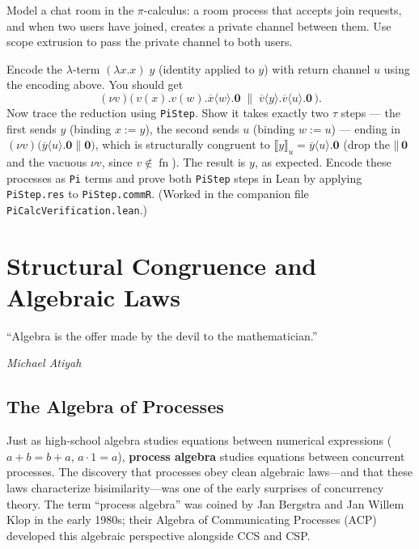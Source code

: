 \documentclass[11pt, a4paper, oneside]{book}
\newcommand{\nil}{\mathbf{0}}
\newcommand{\Par}{\mathbin{\|}}
\newcommand{\res}[1]{(\nu #1)}
\newcommand{\inp}[2]{#1(#2)}
\newcommand{\outp}[2]{\overline{#1}\langle #2 \rangle}
\newcommand{\fn}{\operatorname{fn}}
\newcommand{\lc}[1]{\texttt{#1}}
\newcounter{exercise}[chapter]
\begin{document}
\begin{exercisebox}[title={Exercise 6.1}]
Model a chat room in the $\pi$-calculus: a room process that accepts join
requests, and when two users have joined, creates a private channel between
them. Use scope extrusion to pass the private channel to both users.
\end{exercisebox}

\begin{exercisebox}[title={Exercise 6.2}]
Encode the $\lambda$-term $(\lambda x. x)\; y$ (identity applied to $y$) with
return channel $u$ using the encoding above. You should get
\[
  \res{v}\bigl(\,\inp{v}{x}.\inp{v}{w}.\outp{x}{w}.\nil
    \;\Par\;
    \outp{v}{y}.\outp{v}{u}.\nil\,\bigr).
\]
Now trace the reduction using \lc{PiStep}. Show it takes exactly two
$\tau$ steps --- the first sends $y$ (binding $x := y$), the second sends $u$
(binding $w := u$) --- ending in
$\res{v}\bigl(\outp{y}{u}.\nil \Par \nil\bigr)$, which is structurally
congruent to $⟦y⟧_u = \outp{y}{u}.\nil$ (drop the $\Par\,\nil$ and the vacuous
$\nu v$, since $v \notin \fn$). The result is $y$, as expected.
Encode these processes as \lc{Pi} terms and prove both \lc{PiStep} steps in
Lean by applying \lc{PiStep.res} to \lc{PiStep.commR}. (Worked in the
companion file \lc{PiCalcVerification.lean}.)
\end{exercisebox}

\chapter{Structural Congruence and Algebraic Laws}

\epigraph{``Algebra is the offer made by the devil to the mathematician.''}%
{\textit{Michael Atiyah}}

\section{The Algebra of Processes}

\begin{historical}[title={Process Algebra}]
Just as high-school algebra studies equations between numerical expressions
($a + b = b + a$, $a \cdot 1 = a$), \textbf{process algebra} studies
equations between concurrent processes. The discovery that processes obey
clean algebraic laws---and that these laws characterize bisimilarity---was
one of the early surprises of concurrency theory. The term ``process algebra''
was coined by Jan Bergstra and Jan Willem Klop in the early 1980s; their
Algebra of Communicating Processes (ACP) developed this algebraic perspective
alongside CCS and CSP.
\end{historical}
\end{document}
